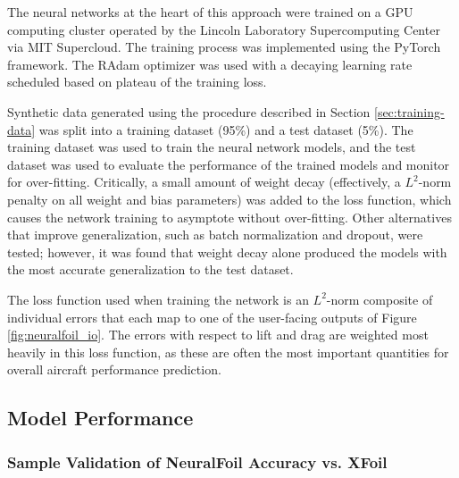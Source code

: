 \documentclass[conf]{new-aiaa}
\begin{document}
    The neural networks at the heart of this approach were trained on a GPU computing cluster operated by the Lincoln Laboratory Supercomputing Center via MIT Supercloud. The training process was implemented using the PyTorch \cite{paszke_pytorch_2019} framework. The RAdam optimizer \cite{liu_variance_2019} was used with a decaying learning rate scheduled based on plateau of the training loss.

    Synthetic data generated using the procedure described in Section \ref{sec:training-data} was split into a training dataset (95\%) and a test dataset (5\%). The training dataset was used to train the neural network models, and the test dataset was used to evaluate the performance of the trained models and monitor for over-fitting. Critically, a small amount of weight decay (effectively, a $L^2$-norm penalty on all weight and bias parameters) was added to the loss function, which causes the network training to asymptote without over-fitting. Other alternatives that improve generalization, such as batch normalization and dropout, were tested; however, it was found that weight decay alone produced the models with the most accurate generalization to the test dataset.

    The loss function used when training the network is an $L^2$-norm composite of individual errors that each map to one of the user-facing outputs of Figure \ref{fig:neuralfoil_io}. The errors with respect to lift and drag are weighted most heavily in this loss function, as these are often the most important quantities for overall aircraft performance prediction.


    \subsection{Model Performance}

    \subsubsection{Sample Validation of NeuralFoil Accuracy vs. XFoil}
    \label{sec:validation_basic}
\end{document}
